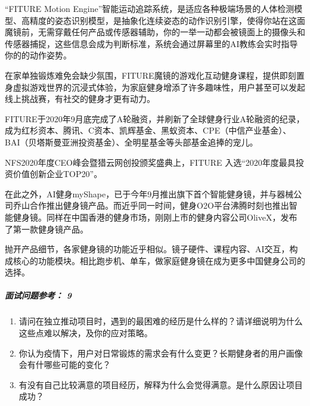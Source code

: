 \documentclass[letterpaper,10pt,english]{sphinxmanual}
\begin{document}
“FITURE Motion
Engine”智能运动追踪系统，是适应各种极端场景的人体检测模型、高精度的姿态识别模型，是抽象化连续姿态的动作识别引擎，使得你站在这面魔镜前，无需穿戴任何产品或传感器辅助，你的一举一动都会被镜面上的摄像头和传感器捕捉，这些信息会成为判断标准，系统会通过屏幕里的AI教练会实时指导你的的动作姿势。

在家单独锻炼难免会缺少氛围，FITURE魔镜的游戏化互动健身课程，提供即刻置身虚拟游戏世界的沉浸式体验，为家庭健身增添了许多趣味性，用户甚至可以发起线上挑战赛，有社交的健身才更有动力。

FITURE于2020年9月底完成了A轮融资，并刷新了全球健身行业A轮融资的纪录，成为红杉资本、腾讯、C资本、凯辉基金、黑蚁资本、CPE（中信产业基金）、BAI（贝塔斯曼亚洲投资基金）、全明星基金等头部基金追捧的宠儿。
%
\begin{footnote}[769]\sphinxAtStartFootnote
{}
%
\end{footnote}

NFS2020年度CEO峰会暨猎云网创投颁奖盛典上，FITURE
入选“2020年度最具投资价值创新企业TOP20”。

在此之外，AI健身myShape，已于今年9月推出旗下首个智能健身镜，并与器械公司乔山合作推出健身镜产品。而近乎同一时间，健身O2O平台沸腾时刻也推出智能健身镜。同样在中国香港的健身市场，刚刚上市的健身内容公司OliveX，发布了第一款健身镜产品。

抛开产品细节，各家健身镜的功能近乎相似。镜子硬件、课程内容、AI交互，构成核心的功能模块。相比跑步机、单车，做家庭健身镜在成为更多中国健身公司的选择。%
\begin{footnote}[770]\sphinxAtStartFootnote
{}
%
\end{footnote}


\subparagraph{面试问题参考： 9\sphinxfootnotemark[771]}
\label{\detokenize{chapter_project/AI_fit:id7}}%
\begin{footnotetext}[771]\sphinxAtStartFootnote
{}
%
\end{footnotetext}\ignorespaces \begin{enumerate}
%
\item {} 
请问在独立推动项目时，遇到的最困难的经历是什么样的？请详细说明为什么这些点难以解决，及你的应对策略。

\item {} 
你认为疫情下，用户对日常锻炼的需求会有什么变更？长期健身者的用户画像会有什哪些可能的变化？

\item {} 
有没有自己比较满意的项目经历，解释为什么会觉得满意。是什么原因让项目成功？

\end{enumerate}
\end{document}
